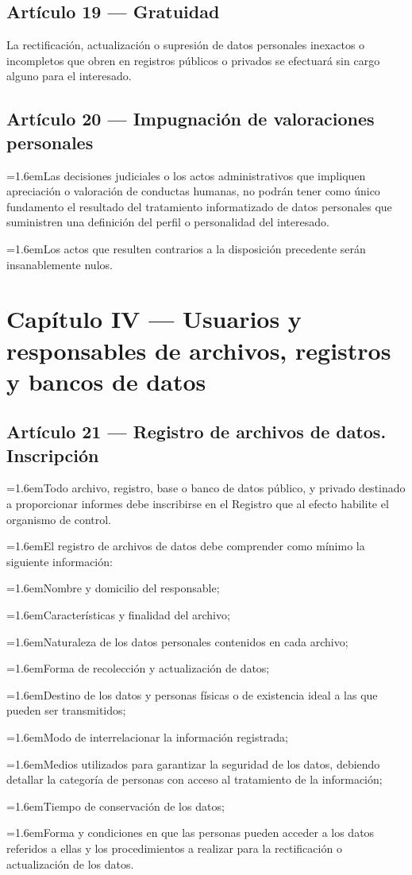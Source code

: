 \documentclass[10pt,a4paper]{article}
\newcommand{\articulo}[1]{\subsection{#1}}
\newcommand{\inciso}[2]{\par{\hangindent=1.6em\hangafter=1\makebox[1.6em][l]{#1}#2\par}}
\begin{document}
\articulo{Artículo 19 --- Gratuidad}
La rectificación, actualización o supresión de datos personales inexactos o incompletos que obren en registros públicos o privados se efectuará sin cargo alguno para el interesado.

\articulo{Artículo 20 --- Impugnación de valoraciones personales}
\inciso{1.}{Las decisiones judiciales o los actos administrativos que impliquen apreciación o valoración de conductas humanas, no podrán tener como único fundamento el resultado del tratamiento informatizado de datos personales que suministren una definición del perfil o personalidad del interesado.}

\inciso{2.}{Los actos que resulten contrarios a la disposición precedente serán insanablemente nulos.}

\section{Capítulo IV --- Usuarios y responsables de archivos, registros y bancos de datos}
\articulo{Artículo 21 --- Registro de archivos de datos. Inscripción}
\inciso{1.}{Todo archivo, registro, base o banco de datos público, y privado destinado a proporcionar informes debe inscribirse en el Registro que al efecto habilite el organismo de control.}

\inciso{2.}{El registro de archivos de datos debe comprender como mínimo la siguiente información:}

\inciso{a)}{Nombre y domicilio del responsable;}

\inciso{b)}{Características y finalidad del archivo;}

\inciso{c)}{Naturaleza de los datos personales contenidos en cada archivo;}

\inciso{d)}{Forma de recolección y actualización de datos;}

\inciso{e)}{Destino de los datos y personas físicas o de existencia ideal a las que pueden ser transmitidos;}

\inciso{f)}{Modo de interrelacionar la información registrada;}

\inciso{g)}{Medios utilizados para garantizar la seguridad de los datos, debiendo detallar la categoría de personas con acceso al tratamiento de la información;}

\inciso{h)}{Tiempo de conservación de los datos;}

\inciso{i)}{Forma y condiciones en que las personas pueden acceder a los datos referidos a ellas y los procedimientos a realizar para la rectificación o actualización de los datos.}
\end{document}
